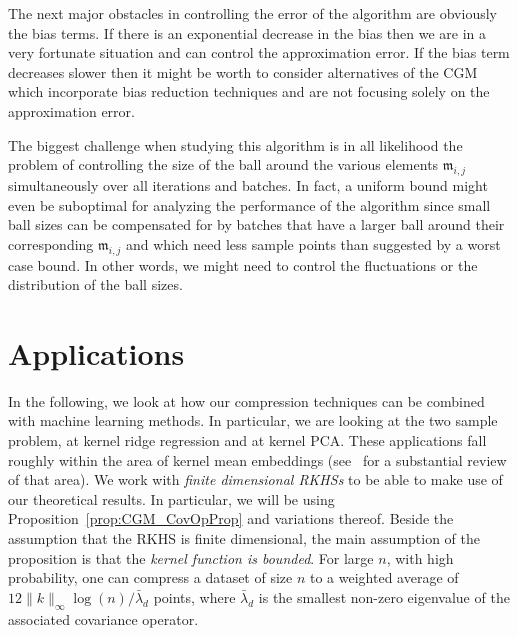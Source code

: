 \documentclass[AHL,Unicode,longabstracts,published]{cedram}
\theoremstyle{remark}
\newcommand{\mean}{\mathfrak{m}}
\begin{document}
The next major obstacles in controlling the error of the algorithm are obviously the bias terms. If there is an exponential decrease in the bias then we are in a very fortunate situation and can control the approximation error. If the bias term decreases slower then it might be worth to consider alternatives of the CGM which incorporate bias reduction techniques and are not focusing solely on the approximation error.

The biggest challenge when studying this algorithm is in all likelihood the problem of controlling the size of the ball around the various elements $\mean_{i,j}$ simultaneously over all iterations and batches. In fact, a uniform bound might even be suboptimal for analyzing the performance of the algorithm since small ball sizes can be compensated for by batches that have a larger ball around their corresponding $\mean_{i,j}$ and which need less sample points than suggested by a worst case bound. In other words, we might need to control the fluctuations or the distribution of the ball sizes.



\section{Applications} \label{sec:applications}

In the following, we look at how our compression techniques can be combined with machine learning methods. In particular, we are looking at the two sample problem, at kernel ridge regression and at kernel PCA. These applications fall roughly within the area of kernel mean embeddings (see~\cite{MUA17} for a substantial review of that area). We work with \emph{finite dimensional RKHSs} to be able to make use of our theoretical results. In particular, we will be using Proposition~\ref{prop:CGM_CovOpProp} and variations thereof. Beside the assumption that the RKHS is finite dimensional, the main assumption of the proposition is that the \emph{kernel function is bounded}. For large $n$, with high probability, one can compress a dataset of size $n$ to a weighted average of $12 \|k\|_\infty \log(n)/\bar \lambda_d$ points, where $\bar \lambda_d$ is the smallest non-zero eigenvalue of the associated covariance operator.
\end{document}
